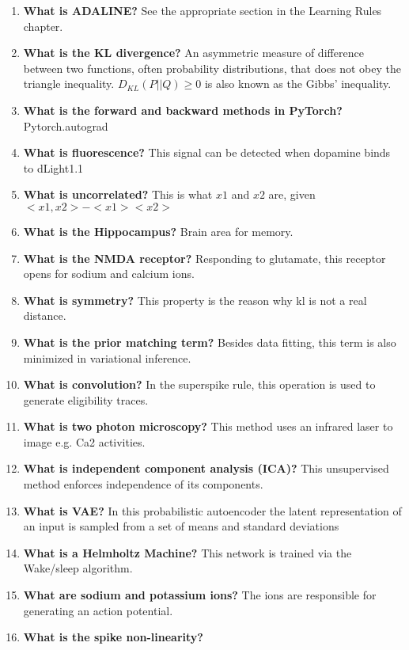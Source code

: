 \documentclass[main]{subfiles}
\begin{document}
\begin{enumerate}
    \item \textbf{What is ADALINE?}
    See the appropriate section in the Learning Rules chapter.
    
    \item \textbf{What is the KL divergence?}
    An asymmetric measure of difference between two functions, often probability distributions, that does not obey the triangle inequality. $D_{KL}(P||Q) \geq 0$ is also known as the Gibbs' inequality.
    
    \item \textbf{What is the forward and backward methods in PyTorch?}
    Pytorch.autograd
    \item \textbf{What is fluorescence?}
    This signal can be detected when dopamine binds to dLight1.1
    \item \textbf{What is uncorrelated?}
    This is what $x1$ and $x2$ are, given $<x1,x2> - <x1><x2>$
    \item \textbf{What is the Hippocampus?} 
    Brain area for memory.
    \item \textbf{What is the NMDA receptor?}
    Responding to glutamate, this receptor opens for sodium and calcium ions.
    \item \textbf{What is symmetry?}
    This property is the reason why kl is not a real distance.
    \item \textbf{What is the prior matching term?}
    Besides data fitting, this term is also minimized in variational inference.
    \item \textbf{What is convolution?}
    In the superspike rule, this operation is used to generate eligibility traces.
    \item \textbf{What is two photon microscopy?}
    This method uses an infrared laser to image e.g. Ca2 activities.
    \item \textbf{What is independent component analysis (ICA)?}
    This unsupervised method enforces independence of its components.
    \item \textbf{What is VAE?}
    In this probabilistic autoencoder the latent representation of an input is sampled from a set of means and standard deviations
    \item \textbf{What is a Helmholtz Machine?}
    This network is trained via the Wake/sleep algorithm.
    \item \textbf{What are sodium and potassium ions?}
    The ions are responsible for generating an action potential.
    \item \textbf{What is the spike non-linearity?}

\end{enumerate}
\end{document}

